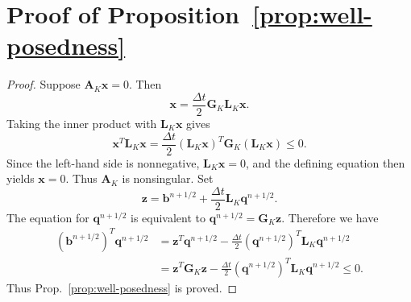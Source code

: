 \documentclass[10pt,reqno]{amsart}
\theoremstyle{remark}
\theoremstyle{definition}
\begin{document}
\section{Proof of Proposition~\ref{prop:well-posedness}}
\label{pf:prop:well-posedness}
\begin{proof}
  Suppose $\boldsymbol{A}_K\boldsymbol x=0$. Then
  $$
    \boldsymbol x=\frac{\Delta t}{2}\boldsymbol{G}_K\boldsymbol{L}_K\boldsymbol x.
  $$
  Taking the inner product with $\boldsymbol{L}_K\boldsymbol x$ gives
  $$
    \boldsymbol x^{T}\boldsymbol{L}_K\boldsymbol x = \frac{\Delta t}{2}(\boldsymbol{L}_K\boldsymbol x)^{T} \boldsymbol{G}_K(\boldsymbol{L}_K\boldsymbol x)\le0.
  $$
  Since the left-hand side is nonnegative, $\boldsymbol{L}_K\boldsymbol x=0$, and the defining equation then yields $\boldsymbol x=0$. Thus $\boldsymbol{A}_K$ is nonsingular. Set
  $$
    \boldsymbol z=\boldsymbol b^{n+1/2}+\frac{\Delta t}{2}\boldsymbol{L}_K\boldsymbol q^{n+1/2}.
  $$
  The equation for $\boldsymbol q^{n+1/2}$ is equivalent to $\boldsymbol q^{n+1/2}=\boldsymbol{G}_K\boldsymbol z$. Therefore we have
  \begin{equation}
  \label{eq:SM1_prop1}
    \begin{aligned}
    (\boldsymbol b^{n+1/2})^{T}\boldsymbol q^{n+1/2} &=\boldsymbol z^{T}\boldsymbol q^{n+1/2} -\frac{\Delta t}{2}(\boldsymbol q^{n+1/2})^{T} \boldsymbol{L}_K\boldsymbol q^{n+1/2}\\
    &=\boldsymbol z^{T}\boldsymbol{G}_K\boldsymbol z -\frac{\Delta t}{2}(\boldsymbol q^{n+1/2})^{T} \boldsymbol{L}_K \boldsymbol q^{n+1/2} \le 0.
    \end{aligned}
  \end{equation}
  Thus Prop.~\ref{prop:well-posedness} is proved.
\end{proof}
\end{document}
